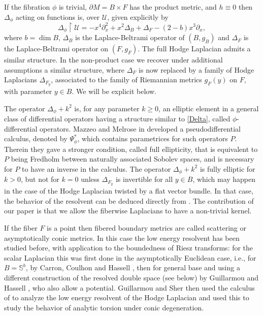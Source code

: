 \documentclass[11pt]{article}
\newcommand{\ie}{i.e.,\xspace}
\numberwithin{equation}{section}
\theoremstyle{plain}
\theoremstyle{definition}
\begin{document}
If the fibration $\phi$ is trivial, $\partial M=B\times F$ has the product metric, and
$h\equiv 0$ then $\Delta_{\phi}$ acting on functions is, over $\mathscr{U}$, given explicitly by
\begin{equation}\label{Delta}
\Delta_{\phi} \restriction \mathscr{U} = -x^{4}\partial_{x}^{2} + x^{2}\Delta_{B} + \Delta_{F} - (2-b)x^{3}\partial_{x},
\end{equation}
where $b= \dim B$, $\Delta_B$ is the Laplace-Beltrami
operator of $(B,g_{B})$ and
$\Delta_{F}$ is the Laplace-Beltrami operator on $(F,g_{F})$.
The full Hodge Laplacian admits a similar structure.
In the non-product case we recover under additional assumptions a similar structure,
where $\Delta_{F}$ is now replaced by a family of Hodge Laplacians $\Delta_{F_y}$, associated to
the family of Riemannian metrics $g_F(y)$ on $F$, with parameter $y\in B$. We will be explicit below.

The operator $\Delta_{\phi}+k^2$ is, for any parameter $k\geq0$, an elliptic element in a general class of differential operators having a structure similar to \eqref{Delta}, called $\phi$-differential operators. Mazzeo and Melrose in \cite{mazzeo1998pseudodifferential} developed a pseudodifferential calculus, denoted by $\Psi^*_\phi$, which contains parametrices for such operators $P$. Therein they gave a stronger condition, called full ellipticity, that
is equivalent to $P$ being Fredholm between naturally associated Sobolev spaces, and is necessary for $P$
to have an inverse in the calculus. The operator $\Delta_{\phi}+k^2$ is fully elliptic for $k>0$, but not for $k=0$ unless $\Delta_{F_y}$ is invertible for all $y\in B$, which may happen in the case of the Hodge Laplacian twisted by a flat vector bundle.
In that case, the behavior of the resolvent can be deduced directly from
\cite{mazzeo1998pseudodifferential}. The contribution of our paper is that we allow the fiberwise Laplacians to have a non-trivial kernel.

If the fiber $F$ is a point then fibered boundary metrics are called scattering or asymptotically conic metrics. In this case the low energy resolvent has been studied before, with application to the boundedness of Riesz transforms:
for the scalar Laplacian this was first done in the asymptotically Euclidean case, \ie for $B= \mathbb{S}^b$, by
Carron, Coulhon and Hassell \cite{carron2006riesz}, then for general base and using a different construction of the resolved double space (see below) by Guillarmou and Hassell
\cite{guillarmou2008resolvent, guillarmou2009resolvent}, who also allow a potential.
Guillarmou and Sher \cite{guillarmou2014low} then used the calculus of \cite{guillarmou2008resolvent} to analyze the low energy resolvent of the Hodge Laplacian and used this to study the behavior of analytic torsion under conic degeneration.
\end{document}
